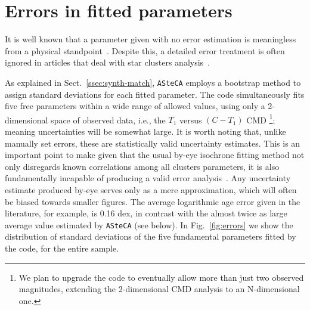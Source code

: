 \documentclass{aa}
\begin{document}

\section{Errors in fitted parameters}
\label{sec:errors-fit}

It is well known that a parameter given with no error estimation is
meaningless from a physical standpoint~\citep{Dolphin_2002,Andrae_2010}.
%
Despite this, a detailed error treatment is often ignored in
articles that deal with star clusters analysis~\citep{Paunzen_2006}.

As explained in Sect.~\ref{ssec:synth-match}, \texttt{ASteCA} employs a
bootstrap method to assign standard deviations for each fitted parameter.
%
The code simultaneously fits five free parameters within a wide range of allowed
values, using only a 2-dimensional space of observed data, i.e., the $T_1$
versus $ (C-T_1)$ CMD \footnote{We plan to upgrade the code to eventually allow
more than just two observed magnitudes, extending the 2-dimensional CMD analysis
to an N-dimensional one.}; meaning uncertainties will be somewhat large.
%
It is worth noting that, unlike manually set errors, these are
statistically valid uncertainty estimates. This is an important point to make
given that the usual by-eye isochrone fitting method not only disregards known
correlations among all clusters parameters, it is also fundamentally incapable
of producing a valid error analysis~\citep{Naylor_2006}. Any uncertainty
estimate produced by-eye serves only as a mere approximation, which will often
be biased towards smaller figures. The average logarithmic age error given in
the literature, for example, is 0.16 dex, in contrast with the almost twice as
large average value estimated by \texttt{ASteCA} (see below).
%
In Fig.~\ref{fig:errors} we show the distribution of standard deviations
of the five fundamental parameters fitted by the code, for the entire sample.
\end{document}
